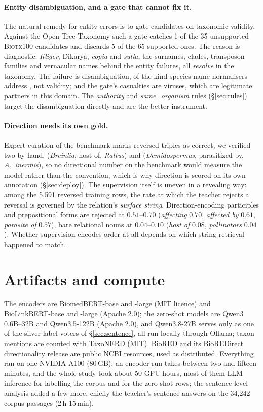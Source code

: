 \documentclass[11pt]{article}
\begin{document}
\paragraph{Entity disambiguation, and a gate that cannot fix it.}
The natural remedy for entity errors is to gate candidates on taxonomic validity. Against the Open
Tree Taxonomy \citep{rees2017opentree} such a gate catches 1 of the 35 unsupported \textsc{Biotx100}
candidates and discards 5 of the 65 supported ones. The reason is diagnostic: \emph{Illiger},
Dikarya, \emph{copia} and \emph{sulla}, the surnames, clades, transposon families and vernacular
names behind the entity failures, all \emph{resolve} in the taxonomy. The failure is
disambiguation, of the kind species-name normalisers address \citep{gerner2010linnaeus}, not
validity; and the gate's casualties are viruses, which are legitimate partners in this domain. The
\emph{authority} and \emph{same\_organism} rules (\S\ref{sec:rules}) target the disambiguation
directly and are the better instrument.

\paragraph{Direction needs its own gold.}
Expert curation of the benchmark marks reversed triples as correct, we verified two by hand,
(\emph{Breinlia}, host of, \emph{Rattus}) and (\emph{Demidospermus}, parasitized by,
\emph{A.\ inermis}), so no directional number on the benchmark would measure the model rather
than the convention, which is why direction is scored on its own annotation (\S\ref{sec:deploy}). The
supervision itself is uneven in a revealing way: among the 5{,}591 reversed training rows, the rate
at which the teacher rejects a reversal is governed by the relation's \emph{surface string}.
Direction-encoding participles and prepositional forms are rejected at $0.51$--$0.70$
(\emph{affecting} $0.70$, \emph{affected by} $0.61$, \emph{parasite of} $0.57$), bare relational nouns
at $0.04$--$0.10$ (\emph{host of} $0.08$, \emph{pollinators} $0.04$). Whether supervision encodes
order at all depends on which string retrieval happened to match.

\section{Artifacts and compute}
\label{app:artifacts}

The encoders are BiomedBERT-base and -large (MIT licence) and BioLinkBERT-base and -large (Apache
2.0); the zero-shot models are Qwen3 0.6B--32B and Qwen3.5-122B (Apache 2.0), and Qwen3.8-27B serves only
as one of the silver-label voters of \S\ref{sec:sentence}, all run locally through
Ollama; taxon mentions are counted with TaxoNERD (MIT). BioRED and its BioREDirect directionality
release are public NCBI resources, used as distributed. Everything ran on one NVIDIA A100 (80\,GB):
an encoder run takes between two and fifteen minutes, and the whole study took about 50 GPU-hours,
most of them LLM inference for labelling the corpus and for the zero-shot rows; the sentence-level
analysis added a few more, chiefly the teacher's sentence answers on the 34{,}242 corpus passages
(2\,h 15\,min).
\end{document}
